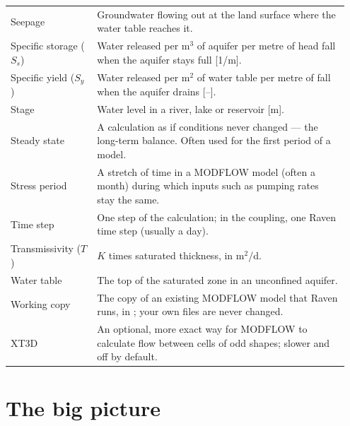 \begin{longtable}{P{0.24\linewidth}P{0.708\linewidth}}
Seepage & Groundwater flowing out at the land surface where the water table reaches it.\\
Specific storage ($S_s$) & Water released per m$^3$ of aquifer per metre of head fall when the aquifer stays full [1/m].\\
Specific yield ($S_y$) & Water released per m$^2$ of water table per metre of fall when the aquifer drains [--].\\
Stage & Water level in a river, lake or reservoir [m].\\
Steady state & A calculation as if conditions never changed --- the long-term balance. Often used for the first period of a model.\\
Stress period & A stretch of time in a MODFLOW model (often a month) during which inputs such as pumping rates stay the same.\\
Time step & One step of the calculation; in the coupling, one Raven time step (usually a day).\\
Transmissivity ($T$) & $K$ times saturated thickness, in m$^2$/d.\\
Water table & The top of the saturated zone in an unconfined aquifer.\\
Working copy & The copy of an existing MODFLOW model that Raven runs, in ; your own files are never changed.\\
XT3D & An optional, more exact way for MODFLOW to calculate flow between cells of odd shapes; slower and off by default.\\\bottomrule
\end{longtable}

\section{The big picture}\label{ch:overview}
